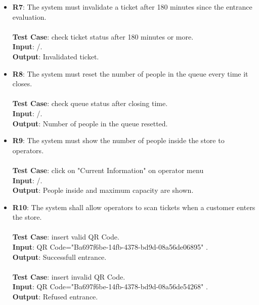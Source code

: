 \begin{itemize}
	\item \textbf{R7}: The system must invalidate a ticket after 180 minutes since the entrance evaluation.  
 \\ \\ \textbf{Test Case}: check ticket status after 180 minutes or more.\\ 
 \textbf{Input}: /.\\ 		\textbf{Output}: Invalidated ticket. \\



	\item \textbf{R8}: The system must reset the number of people in the queue every time it closes. 
 \\ \\ \textbf{Test Case}: check queue status after closing time.\\ 
 \textbf{Input}: /.\\ 		\textbf{Output}: Number of people in the queue resetted. \\


	\item \textbf{R9}: The system must show the number of people inside the store to operators. \\ \\ \textbf{Test Case}: click on "Current Information" on operator menu  \\  \textbf{Input}: /.\\ 		\textbf{Output}: People inside and maximum capacity are shown. \\




	\item \textbf{R10}: The system shall allow operators to scan tickets when a customer enters the store.\\ \\ \textbf{Test Case}: insert valid QR Code.  \\ 
 \textbf{Input}: QR Code="Ba697f6be-14fb-4378-bd9d-08a56de06895" .\\ 		\textbf{Output}: Successfull entrance. \\ \\ \textbf{Test Case}: insert invalid QR Code.\\ 
 \textbf{Input}: QR Code="Ba697f6be-14fb-4378-bd9d-08a56de54268" .\\ 		\textbf{Output}: Refused entrance. \\






\end{itemize}
